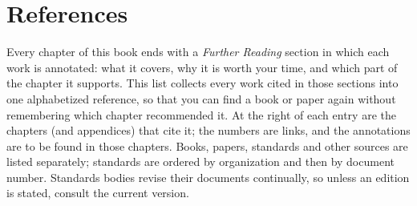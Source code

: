 \chapter*{References}
\label{references}

\providecommand{\citedin}[1]{{\unskip\nobreak\hskip1.5em plus 1fil\penalty50
  \hskip0pt plus -1fil\hbox{}\nobreak\hskip0pt plus 1fil
  \mbox{\footnotesize\itshape #1}\parfillskip=0pt\finalhyphendemerits=0\par}}

Every chapter of this book ends with a \emph{Further Reading} section in which each work is
annotated: what it covers, why it is worth your time, and which part of the chapter it
supports. This list collects every work cited in those sections into one alphabetized
reference, so that you can find a book or paper again without remembering which chapter
recommended it. At the right of each entry are the chapters (and appendices) that cite it;
the numbers are links, and the annotations are to be found in those chapters. Books, papers,
standards and other sources are listed separately; standards are ordered by organization and
then by document number. Standards bodies revise their documents continually, so unless an
edition is stated, consult the current version.

